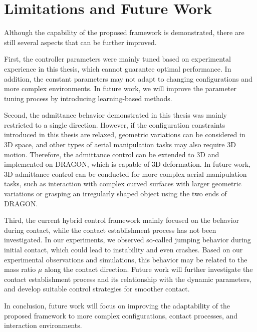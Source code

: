 \section{Limitations and Future Work}

Although the capability of the proposed framework is demonstrated, there are still several aspects that can be further improved.

First, the controller parameters were mainly tuned based on experimental experience in this thesis, which cannot guarantee optimal performance. In addition, the constant parameters may not adapt to changing configurations and more complex environments. In future work, we will improve the parameter tuning process by introducing learning-based methods.

Second, the admittance behavior demonstrated in this thesis was mainly restricted to a single direction. However, if the configuration constraints introduced in this thesis are relaxed, geometric variations can be considered in 3D space, and other types of aerial manipulation tasks may also require 3D motion. Therefore, the admittance control can be extended to 3D and implemented on DRAGON, which is capable of 3D deformation. In future work, 3D admittance control can be conducted for more complex aerial manipulation tasks, such as interaction with complex curved surfaces with larger geometric variations or grasping an irregularly shaped object using the two ends of DRAGON.

Third, the current hybrid control framework mainly focused on the behavior during contact, while the contact establishment process has not been investigated. In our experiments, we observed so-called jumping behavior during initial contact, which could lead to instability and even crashes. Based on our experimental observations and simulations, this behavior may be related to the mass ratio $\mu$ along the contact direction. Future work will further investigate the contact establishment process and its relationship with the dynamic parameters, and develop suitable control strategies for smoother contact.

In conclusion, future work will focus on improving the adaptability of the proposed framework to more complex configurations, contact processes, and interaction environments.

